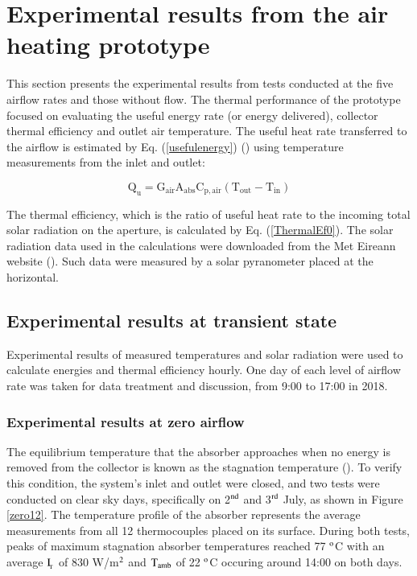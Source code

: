 
\section{Experimental results from the air heating prototype}

This section presents the experimental results from tests conducted at the five airflow rates and those without flow. The thermal performance of the prototype focused on evaluating the useful energy rate (or energy delivered), collector thermal efficiency and outlet air temperature. The useful heat rate transferred to the airflow is estimated by Eq. (\ref{usefulenergy}) (\cite{Kalogirou2004}) using temperature measurements from the inlet and outlet:

\vspace{-0.75cm}
\begin{equation}
\mathrm{{Q_u} = {G_{air}}{A_{abs}}{C_{p,air}}({T_{out}} - {T_{in}})}
\label{usefulenergy}
\end{equation}

The thermal efficiency, which is the ratio of useful heat rate to the incoming total solar radiation on the aperture, is calculated by Eq. (\ref{ThermalEf0}). The solar radiation data used in the calculations were downloaded from the Met Eireann website (\cite{MetEireann2018}). Such data were measured by a solar pyranometer placed at the horizontal.

\subsection{Experimental results at transient state}

Experimental results of measured temperatures and solar radiation were used to calculate energies and thermal efficiency hourly. One day of each level of airflow rate was taken for data treatment and discussion, from 9:00 to 17:00 in 2018. 

\subsubsection{Experimental results at zero airflow}

The equilibrium temperature that the absorber approaches when no energy is removed from the collector is known as the stagnation temperature (\cite{Rabl1985}). To verify this condition, the system's inlet and outlet were closed, and two tests were conducted on clear sky days, specifically on 2$^{\rm{nd}}$ and 3$^{\rm{rd}}$ July, as shown in Figure \ref{zero12}. The temperature profile of the absorber represents the average measurements from all 12 thermocouples placed on its surface. During both tests, peaks of maximum stagnation absorber temperatures reached 77 $^{\rm{o}}$C with an average $\rm{I_{\!_T}}$ of 830 W/m$^{\rm{2}}$ and $\rm{T_{amb}}$ of 22 $^{\rm{o}}$C occuring around 14:00 on both days.

